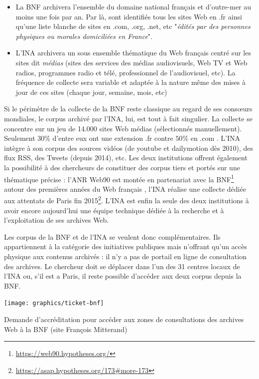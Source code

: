 \documentclass[symmetric,justified,marginals=raggedouter]{tufte-book}
\begin{document}
\begin{itemize}[leftmargin=*]  
\item La BNF archivera l'ensemble du domaine national français et d'outre-mer au moins une fois par an. Par là, sont identifiés tous les sites Web en .fr ainsi qu'une liste blanche de sites en .com, .org, .net, etc "\textit{édités par des personnes physiques ou morales domiciliées en France}".
\item L'INA archivera un sous ensemble thématique du Web français centré sur les sites dit \textit{médias} (sites des services des médias audiovisuels, Web TV et Web radios, programmes radio et télé, professionnel de l'audiovisuel, etc). La fréquence de collecte sera variable et adaptée à la nature même des mises à jour de ces sites (chaque jour, semaine, mois, etc)
\end{itemize}

Si le périmètre de la collecte de la BNF reste classique au regard de ses consœurs mondiales, le corpus archivé par l'INA, lui, est tout à fait singulier. La collecte se concentre sur un jeu de 14.000 sites Web médias (sélectionnés manuellement). Seulement $30\%$ d'entre eux ont une extension .fr contre $50\%$ en .com \citep{drugeon_technical_2005}. L'INA intègre à son corpus des sources vidéos (de youtube et dailymotion dès 2010), des flux RSS, des Tweets (depuis 2014), etc. Les deux institutions offrent également la possibilité à des chercheurs de constituer des corpus tiers et portés sur une thématique précise : l'ANR Web90 est montée en partenariat avec la BNF\footnote{\url{https://web90.hypotheses.org/}} autour des premières années du Web français \citep{schafer_web_2016}, l'INA réalise une collecte dédiée aux attentats de Paris fin 2015\footnote{\url{https://asap.hypotheses.org/173\#more-173}}. L'INA est enfin la seule des deux institutions à avoir encore aujourd'hui une équipe technique dédiée à la recherche et à l'exploitation de ses archives Web.

Les corpus de la BNF et de l'INA se veulent donc complémentaires. Ils appartiennent à la catégorie des initiatives publiques mais n'offrant qu'un accès physique aux contenus archivés : il n'y a pas de portail en ligne de consultation des archives. Le chercheur doit se déplacer dans l'un des 31 centres locaux de l'INA ou, s'il est a Paris, il reste possible d'accéder aux deux corpus depuis la BNF.

\begin{marginfigure}%
  \texttt{[image: graphics/ticket-bnf]}
  \vspace*{0.2cm}  
  \caption{Demande d'accréditation pour accéder aux zones de consultations des archives Web à la BNF (site François Mitterand)}
  \label{fig:ticket-bnf}
\end{marginfigure} 
\end{document}
